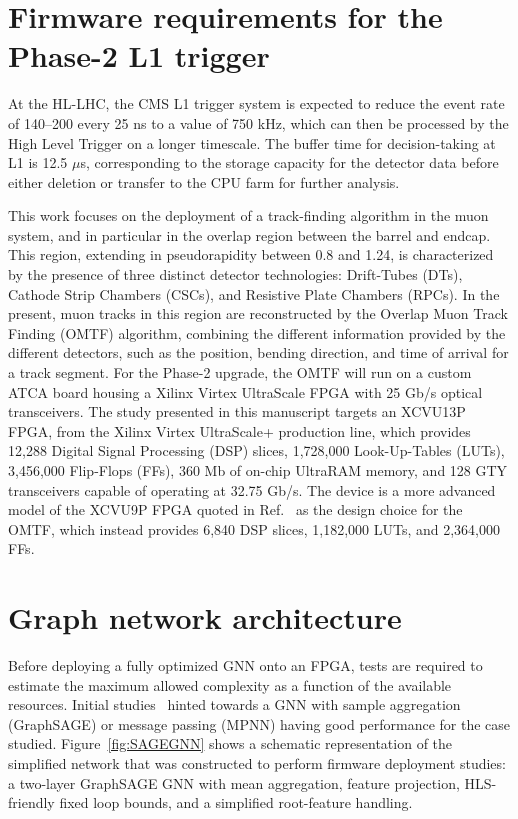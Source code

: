 \documentclass{IEEEtran}
\begin{document}
\section{Firmware requirements for the Phase-2 L1 trigger}
At the HL-LHC, the CMS L1 trigger system is expected to reduce the event rate of 140--200 every 25 ns to a value of 750 kHz, which can then be processed by the High Level Trigger on a longer timescale. The buffer time for decision-taking at L1 is 12.5 $\mu$s, corresponding to the storage capacity for the detector data before either deletion or transfer to the CPU farm for further analysis.

This work focuses on the deployment of a track-finding algorithm in the muon system, and in particular in the overlap region between the barrel and endcap. This region, extending in pseudorapidity between 0.8 and 1.24, is characterized by the presence of three distinct detector technologies: Drift-Tubes (DTs), Cathode Strip Chambers (CSCs), and Resistive Plate Chambers (RPCs). In the present, muon tracks in this region are reconstructed by the Overlap Muon Track Finding (OMTF) algorithm, combining the different information provided by the different detectors, such as the position, bending direction, and time of arrival for a track segment. For the Phase-2 upgrade, the OMTF will run on a custom ATCA board housing a Xilinx Virtex UltraScale FPGA with 25 Gb/s optical transceivers. The study presented in this manuscript targets an XCVU13P FPGA, from the Xilinx Virtex UltraScale+ production line, which provides 12,288 Digital Signal Processing (DSP) slices, 1,728,000 Look-Up-Tables (LUTs), 3,456,000 Flip-Flops (FFs), 360 Mb of on-chip UltraRAM memory, and 128 GTY transceivers capable of operating at 32.75 Gb/s. The device is a more advanced model of the XCVU9P FPGA quoted in Ref.~\cite{CERN-LHCC-2020-004} as the design choice for the OMTF, which instead provides 6,840 DSP slices, 1,182,000 LUTs, and 2,364,000 FFs.



\section{Graph network architecture}

Before deploying a fully optimized GNN onto an FPGA, tests are required to estimate the maximum allowed complexity as a function of the available resources. Initial studies~\cite{Leguina:2025suh,Cardini:2025IML} hinted towards a GNN with sample aggregation (GraphSAGE) or message passing (MPNN) having good performance for the case studied. Figure~\ref{fig:SAGEGNN} shows a schematic representation of the simplified network that was constructed to perform firmware deployment studies: a two-layer GraphSAGE GNN with mean aggregation, feature projection, HLS-friendly fixed loop bounds, and a simplified root-feature handling. 
\end{document}
